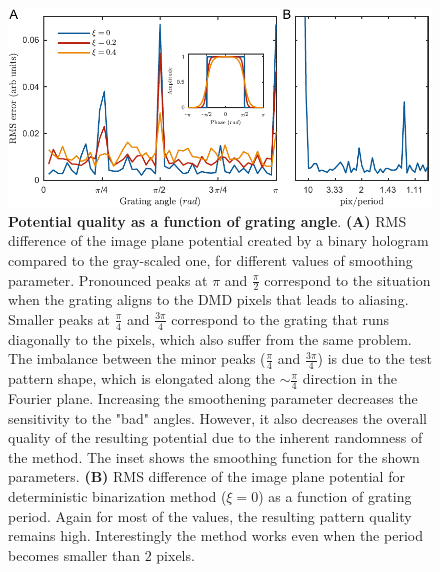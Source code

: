 \begin{figure}[t]
	\centering
	\includegraphics[scale=1]{figures/DMD_K_rotation_v3.pdf}
	\caption{{\bf Potential quality as a function of grating angle}. {\bf (A)} RMS difference of the image plane potential created by a binary hologram compared to the gray-scaled one, for different values of smoothing parameter. Pronounced peaks at $\pi$ and $\frac{\pi}{2}$ correspond to the situation when the grating aligns to the DMD pixels that leads to aliasing. Smaller peaks at $\frac{\pi}{4}$ and $\frac{3\pi}{4}$ correspond to the grating that runs diagonally to the pixels, which also suffer from the same problem. The imbalance between the minor peaks ($\frac{\pi}{4}$ and $\frac{3\pi}{4}$) is due to the test pattern shape, which is elongated along the $\sim \frac{\pi}{4}$ direction in the Fourier plane. Increasing the smoothening parameter decreases the sensitivity to the "bad" angles. However, it also decreases the overall quality of the resulting potential due to the inherent randomness of the method. The inset shows the smoothing function for the shown parameters. {\bf (B)} RMS difference of the image plane potential for deterministic binarization method ($\xi = 0$) as a function of grating period. Again for most of the values, the resulting pattern quality remains high. Interestingly the method works even when the period becomes smaller than $2$ pixels.}
	\label{fig:DMD_K_rotation}
\end{figure}

